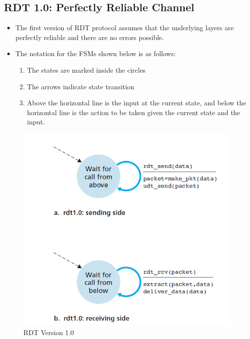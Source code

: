 \documentclass{article}
\theoremstyle{plain}
\theoremstyle{definition}
\begin{document}
\subsection{RDT 1.0: Perfectly Reliable Channel}
\begin{itemize}
    \item The first version of RDT protocol assumes that the underlying layers are perfectly reliable and there are no errors possible.
    
    \item The notation for the FSMs shown below is as follows:
    \begin{enumerate}
        \item The states are marked inside the circles
        
        \item The arrows indicate state transition
        
        \item Above the horizontal line is the input at the current state, and below the horizontal line is the action to be taken given the current state and the input. 
    \end{enumerate}
\end{itemize}
\begin{figure}[!ht]
    \centering
    \includegraphics[scale=0.8]{rdt1.png}
    \caption{RDT Version 1.0}
    \label{fig:my_label_3}
\end{figure}
\end{document}
